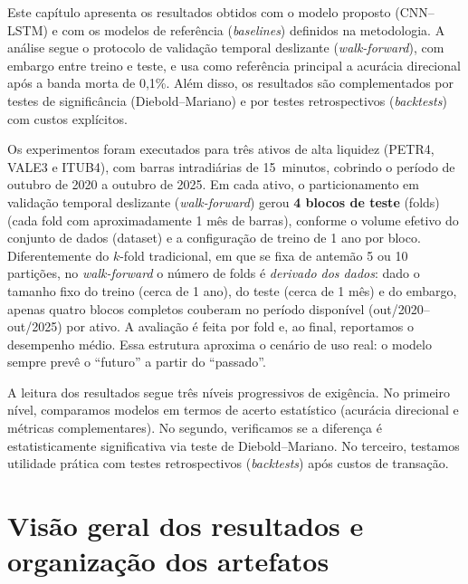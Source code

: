
Este capítulo apresenta os resultados obtidos com o modelo proposto (CNN--LSTM) e com os
modelos de referência (\textit{baselines}) definidos na metodologia. A análise segue o protocolo de validação temporal deslizante (\textit{walk-forward}), com
embargo entre treino e teste, e usa como referência principal a acurácia direcional após a banda
morta de 0,1\%. Além disso, os resultados são complementados por testes de significância
(Diebold--Mariano) e por testes retrospectivos (\textit{backtests}) com custos explícitos.

Os experimentos foram executados para três ativos de alta liquidez (PETR4, VALE3 e ITUB4),
com barras intradiárias de 15~minutos, cobrindo o período de outubro de 2020 a outubro de 2025.
Em cada ativo, o particionamento em validação temporal deslizante (\textit{walk-forward}) gerou \textbf{4 blocos de teste} (folds)
(cada fold com aproximadamente 1 mês de barras), conforme o volume efetivo do conjunto de dados (dataset)
e a configuração de treino de 1 ano por bloco. Diferentemente do $k$-fold tradicional, em que se fixa de antemão
5 ou 10 partições, no \textit{walk-forward} o número de folds é \emph{derivado dos dados}: dado o tamanho fixo do treino
(cerca de 1 ano), do teste (cerca de 1 mês) e do embargo, apenas quatro blocos completos couberam no período
disponível (out/2020--out/2025) por ativo. A avaliação é feita por fold e, ao final,
reportamos o desempenho médio. Essa estrutura aproxima o cenário de uso real:
o modelo sempre prevê o ``futuro'' a partir do ``passado''.

A leitura dos resultados segue três níveis progressivos de exigência.
No primeiro nível, comparamos modelos em termos de acerto estatístico (acurácia direcional
e métricas complementares). No segundo, verificamos se a diferença é estatisticamente
significativa via teste de Diebold--Mariano. No terceiro, testamos utilidade prática com
testes retrospectivos (\textit{backtests}) após custos de transação.

\section{Visão geral dos resultados e organização dos artefatos}

